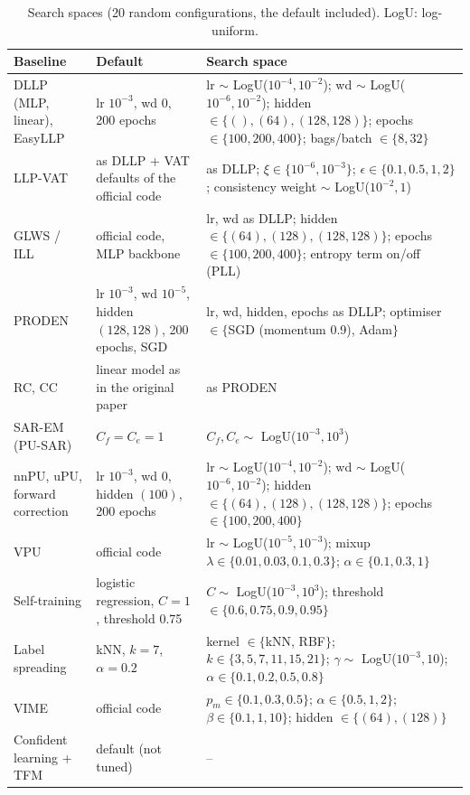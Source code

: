 \begin{table}[!htbp]
\centering
\caption{Search spaces (20 random configurations, the default included). LogU: log-uniform.}
\label{tab:tuning}
\footnotesize
{%
\begin{tabular}{@{}>{\raggedright\arraybackslash}p{}>{\raggedright\arraybackslash}p{}>{\raggedright\arraybackslash}p{}@{}}
\toprule
Baseline & Default & Search space \\
\midrule
DLLP (MLP, linear), EasyLLP & lr $10^{-3}$, wd 0, 200 epochs & lr $\sim$ LogU($10^{-4},10^{-2}$); wd $\sim$ LogU($10^{-6},10^{-2}$); hidden $\in\{(),(64),(128,128)\}$; epochs $\in\{100,200,400\}$; bags/batch $\in\{8,32\}$ \\
LLP-VAT & as DLLP + VAT defaults of the official code & as DLLP; $\xi\in\{10^{-6},10^{-3}\}$; $\epsilon\in\{0.1,0.5,1,2\}$; consistency weight $\sim$ LogU($10^{-2},1$) \\
GLWS / ILL & official code, MLP backbone & lr, wd as DLLP; hidden $\in\{(64),(128),(128,128)\}$; epochs $\in\{100,200,400\}$; entropy term on/off (PLL) \\
PRODEN & lr $10^{-3}$, wd $10^{-5}$, hidden $(128,128)$, 200 epochs, SGD & lr, wd, hidden, epochs as DLLP; optimiser $\in\{$SGD (momentum 0.9), Adam$\}$ \\
RC, CC & linear model as in the original paper & as PRODEN \\
SAR-EM (PU-SAR) & $C_f=C_e=1$ & $C_f,C_e\sim$ LogU($10^{-3},10^{3}$) \\
nnPU, uPU, forward correction & lr $10^{-3}$, wd 0, hidden $(100)$, 200 epochs & lr $\sim$ LogU($10^{-4},10^{-2}$); wd $\sim$ LogU($10^{-6},10^{-2}$); hidden $\in\{(64),(128),(128,128)\}$; epochs $\in\{100,200,400\}$ \\
VPU & official code & lr $\sim$ LogU($10^{-5},10^{-3}$); mixup $\lambda\in\{0.01,0.03,0.1,0.3\}$; $\alpha\in\{0.1,0.3,1\}$ \\
Self-training & logistic regression, $C=1$, threshold 0.75 & $C\sim$ LogU($10^{-3},10^{3}$); threshold $\in\{0.6,0.75,0.9,0.95\}$ \\
Label spreading & kNN, $k=7$, $\alpha=0.2$ & kernel $\in\{$kNN, RBF$\}$; $k\in\{3,5,7,11,15,21\}$; $\gamma\sim$ LogU($10^{-3},10$); $\alpha\in\{0.1,0.2,0.5,0.8\}$ \\
VIME & official code & $p_m\in\{0.1,0.3,0.5\}$; $\alpha\in\{0.5,1,2\}$; $\beta\in\{0.1,1,10\}$; hidden $\in\{(64),(128)\}$ \\
Confident learning + TFM & default (not tuned) & -- \\
\bottomrule
\end{tabular}}
\end{table}

